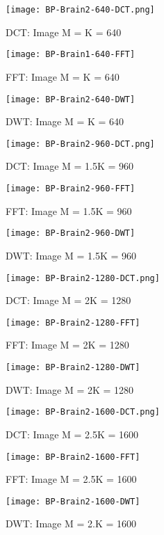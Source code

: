 \documentclass[titlepage,oneside, 12pt]{book}
\theoremstyle{break}
\begin{document}
\begin{figure}[!h]
\centering
{}
  \texttt{[image: BP-Brain2-640-DCT.png]}
  \caption{DCT: Image M = K = 640}\label{fig:BP-Brain2-640-DCT}
\endminipage
\hspace*{2em}
  \texttt{[image: BP-Brain1-640-FFT]}
  \caption{FFT: Image M = K = 640}\label{fig:BP-Brain2-640-FFT}
\endminipage
\hspace*{2em}
%
  \texttt{[image: BP-Brain2-640-DWT]}
  \caption{DWT: Image M = K = 640}\label{fig:BP-Brain2-640-DWT}
\endminipage
\hspace*{2em}
\end{figure}

\begin{figure}[!h]
\centering
{}
  \texttt{[image: BP-Brain2-960-DCT.png]}
  \caption{DCT: Image M = 1.5K = 960}\label{fig:BP-Brain2-960-DCT}
\endminipage
\hspace*{2em}
  \texttt{[image: BP-Brain2-960-FFT]}
  \caption{FFT: Image M = 1.5K = 960}\label{fig:BP-Brain2-960-FFT}
\endminipage
\hspace*{2em}
%
  \texttt{[image: BP-Brain2-960-DWT]}
  \caption{DWT: Image M = 1.5K = 960}\label{fig:BP-Brain2-960-DWT}
\endminipage
\hspace*{2em}
\end{figure}

\clearpage
\begin{figure}[!h]
\centering
{}
  \texttt{[image: BP-Brain2-1280-DCT.png]}
  \caption{DCT: Image M = 2K = 1280}\label{fig:BP-Brain2-1280-DCT}
\endminipage
\hspace*{2em}
  \texttt{[image: BP-Brain2-1280-FFT]}
  \caption{FFT: Image M = 2K = 1280}\label{fig:BP-Brain2-1280-FFT}
\endminipage
\hspace*{2em}
%
  \texttt{[image: BP-Brain2-1280-DWT]}
  \caption{DWT: Image M = 2K = 1280}\label{fig:BP-Brain2-1280-DWT}
\endminipage
\hspace*{2em}
\end{figure}

\begin{figure}[!h]
\centering
{}
  \texttt{[image: BP-Brain2-1600-DCT.png]}
  \caption{DCT: Image M = 2.5K = 1600}\label{fig:BP-Brain2-1600-DCT}
\endminipage
\hspace*{2em}
  \texttt{[image: BP-Brain2-1600-FFT]}
  \caption{FFT: Image M = 2.5K = 1600}\label{fig:BP-Brain2-1600-FFT}
\endminipage
\hspace*{2em}
%
  \texttt{[image: BP-Brain2-1600-DWT]}
  \caption{DWT: Image M = 2.K = 1600}\label{fig:BP-Brain2-1600-DWT}
\endminipage
\hspace*{2em}
\end{figure}
\end{document}
